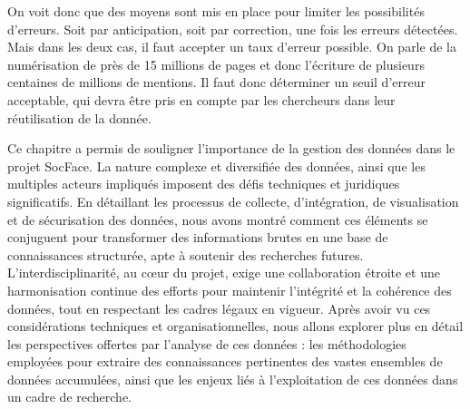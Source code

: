 On voit donc que des moyens sont mis en place pour limiter les possibilités d’erreurs. Soit par anticipation, soit par correction, une fois les erreurs détectées. Mais dans les deux cas, il faut accepter un taux d’erreur possible. On parle de la numérisation de près de 15 millions de pages et donc l’écriture de plusieurs centaines de millions de mentions. Il faut donc déterminer un seuil d’erreur acceptable, qui devra être pris en compte par les chercheurs dans leur réutilisation de la donnée.

Ce chapitre a permis de souligner l’importance de la gestion des données dans le projet SocFace. La nature complexe et diversifiée des données, ainsi que les multiples acteurs impliqués imposent des défis techniques et juridiques significatifs. En détaillant les processus de collecte, d’intégration, de visualisation et de sécurisation des données, nous avons montré comment ces éléments se conjuguent pour transformer des informations brutes en une base de connaissances structurée, apte à soutenir des recherches futures. L’interdisciplinarité, au cœur du projet, exige une collaboration étroite et une harmonisation continue des efforts pour maintenir l’intégrité et la cohérence des données, tout en respectant les cadres légaux en vigueur. Après avoir vu ces considérations techniques et organisationnelles, nous allons explorer plus en détail les perspectives offertes par l’analyse de ces données : les méthodologies employées pour extraire des connaissances pertinentes des vastes ensembles de données accumulées, ainsi que les enjeux liés à l’exploitation de ces données dans un cadre de recherche. 